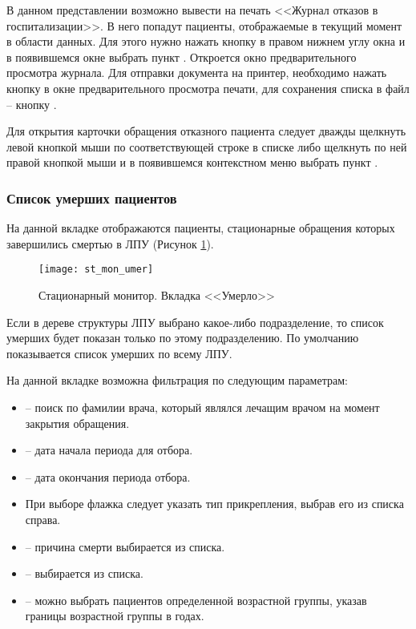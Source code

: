 В данном представлении возможно вывести на печать <<Журнал отказов в госпитализации>>. В него попадут пациенты, отображаемые в текущий момент в области данных. Для этого нужно нажать кнопку  в правом нижнем углу окна и в появившемся окне выбрать пункт . Откроется окно предварительного просмотра журнала. Для отправки документа на принтер, необходимо нажать кнопку   в окне предварительного просмотра печати, для сохранения списка в файл – кнопку .

Для открытия карточки обращения отказного пациента следует дважды щелкнуть левой кнопкой мыши по соответствующей строке в списке либо щелкнуть по ней правой кнопкой мыши и в появившемся контекстном меню выбрать пункт .

\subsubsection{Список умерших пациентов}

На данной вкладке отображаются пациенты, стационарные обращения которых завершились смертью в ЛПУ (Рисунок \ref{img_st_mon_umer}).

\begin{figure}[ht]\centering
   \texttt{[image: st\_mon\_umer]}
   \caption{Стационарный монитор. Вкладка <<Умерло>>}
   \label{img_st_mon_umer}
\end{figure}

Если в дереве структуры ЛПУ выбрано какое-либо подразделение, то список умерших будет показан только по этому подразделению. По умолчанию показывается список умерших по всему ЛПУ.

На данной вкладке возможна фильтрация по следующим параметрам:
\begin{itemize}
 \item {} – поиск по фамилии врача, который являлся лечащим врачом на момент закрытия обращения.
 \item {} – дата начала периода для отбора.
 \item {} – дата окончания периода отбора.
 \item При выборе флажка  следует указать тип прикрепления, выбрав его из списка справа.
 \item {} – причина смерти выбирается из списка.
 \item {} – выбирается из списка.
 \item {} – можно выбрать пациентов определенной возрастной группы, указав границы возрастной группы в годах.
\end{itemize}
 
